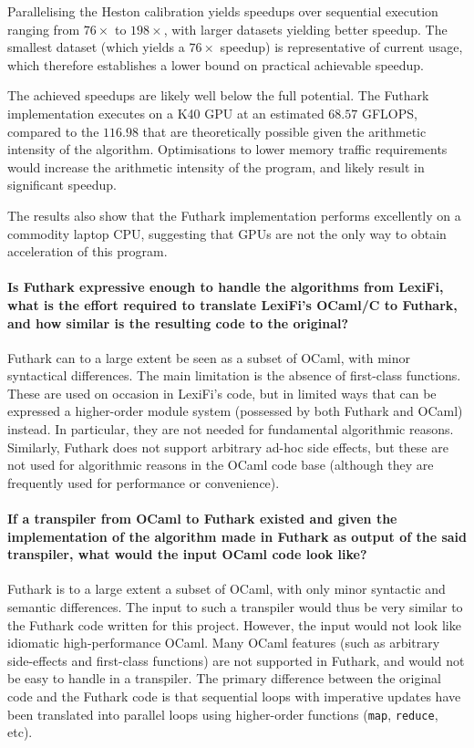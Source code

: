 \documentclass{article}
\begin{document}
Parallelising the Heston calibration yields speedups over sequential
execution ranging from $76\times$ to $198\times$, with larger datasets
yielding better speedup.  The smallest dataset (which yields a
$76\times$ speedup) is representative of current usage, which
therefore establishes a lower bound on practical achievable speedup.

The achieved speedups are likely well below the full potential.  The
Futhark implementation executes on a K40 GPU at an estimated $68.57$
GFLOPS, compared to the $116.98$ that are theoretically possible given
the arithmetic intensity of the algorithm.  Optimisations to lower
memory traffic requirements would increase the arithmetic intensity of
the program, and likely result in significant speedup.

The results also show that the Futhark implementation performs
excellently on a commodity laptop CPU, suggesting that GPUs are not
the only way to obtain acceleration of this program.

\paragraph{Is Futhark expressive enough to handle the algorithms from
  LexiFi, what is the effort required to translate LexiFi's OCaml/C to
  Futhark, and how similar is the resulting code to the original?}

Futhark can to a large extent be seen as a subset of OCaml, with minor
syntactical differences.  The main limitation is the absence of
first-class functions.  These are used on occasion in LexiFi's code,
but in limited ways that can be expressed a higher-order module system
(possessed by both Futhark and OCaml) instead.  In particular, they are
not needed for fundamental algorithmic reasons.  Similarly, Futhark
does not support arbitrary ad-hoc side effects, but these are not used
for algorithmic reasons in the OCaml code base (although they are
frequently used for performance or convenience).

\paragraph{If a transpiler from OCaml to Futhark existed and given the
  implementation of the algorithm made in Futhark as output of the
  said transpiler, what would the input OCaml code look like?}

Futhark is to a large extent a subset of OCaml, with only minor
syntactic and semantic differences.  The input to such a transpiler
would thus be very similar to the Futhark code written for this
project.  However, the input would not look like idiomatic
high-performance OCaml.  Many OCaml features (such as arbitrary
side-effects and first-class functions) are not supported in Futhark,
and would not be easy to handle in a transpiler.  The primary
difference between the original code and the Futhark code is that
sequential loops with imperative updates have been translated into
parallel loops using higher-order functions (\texttt{map},
\texttt{reduce}, etc).
\end{document}
